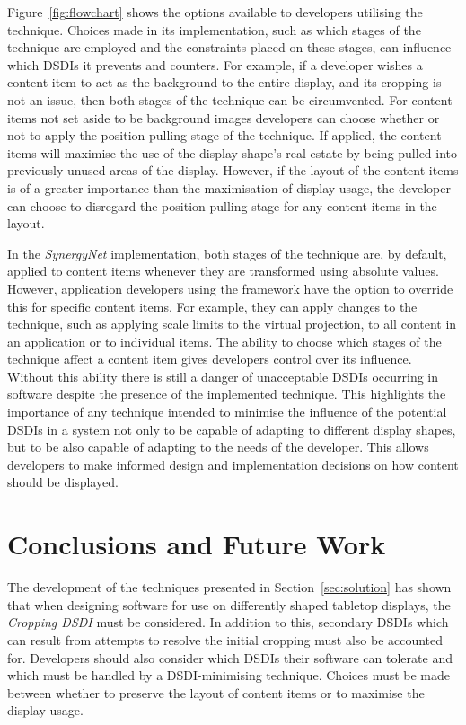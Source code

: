 \documentclass[review,5p,times,twocolumn]{elsarticle}
\begin{document}
Figure~\ref{fig:flowchart} shows the options available to developers utilising the technique.
Choices made in its implementation, such as which stages of the technique are employed and the constraints placed on these stages, can influence which \acp{DSDI} it prevents and counters.
For example, if a developer wishes a content item to act as the background to the entire display, and its cropping is not an issue, then both stages of the technique can be circumvented.
For content items not set aside to be background images developers can choose whether or not to apply the position pulling stage of the technique.
If applied, the content items will maximise the use of the display shape's real estate by being pulled into previously unused areas of the display.
However, if the layout of the content items is of a greater importance than the maximisation of display usage, the developer can choose to disregard the position pulling stage for any content items in the layout.

In the {\emph{SynergyNet}} implementation, both stages of the technique are, by default, applied to content items whenever they are transformed using absolute values.
However, application developers using the framework have the option to override this for specific content items.
For example, they can apply changes to the technique, such as applying scale limits to the virtual projection, to all content in an application or to individual items.
The ability to choose which stages of the technique affect a content item gives developers control over its influence.
Without this ability there is still a danger of unacceptable \acp{DSDI} occurring in software despite the presence of the implemented technique.
This highlights the importance of any technique intended to minimise the influence of the potential \acp{DSDI} in a system not only to be capable of adapting to different display shapes, but to be also capable of adapting to the needs of the developer. 
This allows developers to make informed design and implementation decisions on how content should be displayed.

\section{Conclusions and Future Work}
\label{sec:conclusion}

The development of the techniques presented in Section~\ref{sec:solution} has shown that when designing software for use on differently shaped tabletop displays, the {\emph{Cropping \ac{DSDI}}} must be considered.
In addition to this, secondary \acp{DSDI} which can result from attempts to resolve the initial cropping must also be accounted for.
Developers should also consider which \acp{DSDI} their software can tolerate and which must be handled by a \ac{DSDI}-minimising technique.
Choices must be made between whether to preserve the layout of content items or to maximise the display usage.
\end{document}
